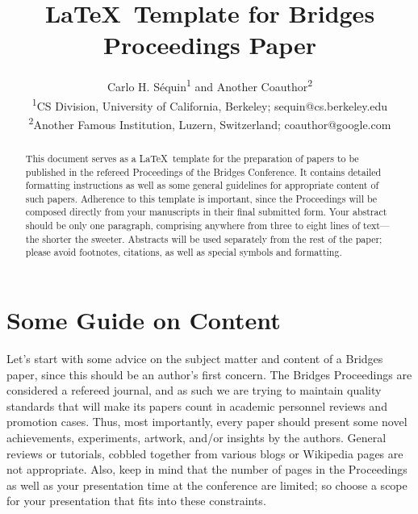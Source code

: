\documentclass[letterpaper,11pt]{article}
\title{\LaTeX\ Template for Bridges Proceedings Paper}
\author{Carlo H. S\'equin\textsuperscript{1} and Another Coauthor\textsuperscript{2}
\vspace{10pt}\\
\textsuperscript{1}CS Division, University of California, Berkeley; sequin@cs.berkeley.edu\\
\textsuperscript{2}Another Famous Institution, Luzern, Switzerland; coauthor@google.com} %
\date{}					%
\begin{document}
\maketitle

\thispagestyle{empty}

\begin{abstract}

This document serves as a \LaTeX\ template for the preparation of papers to be
published in the refereed Proceedings of the Bridges Conference. It
contains detailed formatting instructions as well as some general
guidelines for appropriate content of such papers. Adherence to this
template is important, since the Proceedings will be composed directly
from your manuscripts in their final submitted form. Your abstract
should be only one paragraph, comprising anywhere from three to eight
lines of text---the shorter the sweeter. Abstracts will be used
separately from the rest of the paper; please avoid footnotes,
citations, as well as special symbols and formatting.

\end{abstract}


\section*{Some Guide on Content}


Let's start with some advice on the subject matter and content of a
Bridges paper, since this should be an author's first concern. The
Bridges Proceedings are considered a refereed journal, and as such we
are trying to maintain quality standards that will make its papers count
in academic personnel reviews and promotion cases. Thus, most
importantly, every paper should present some novel achievements,
experiments, artwork, and/or insights by the authors. General reviews or
tutorials, cobbled together from various blogs or Wikipedia pages are
not appropriate. Also, keep in mind that the number of pages in the
Proceedings as well as your presentation time at the conference are
limited; so choose a scope for your presentation that fits into these
constraints.
\end{document}
